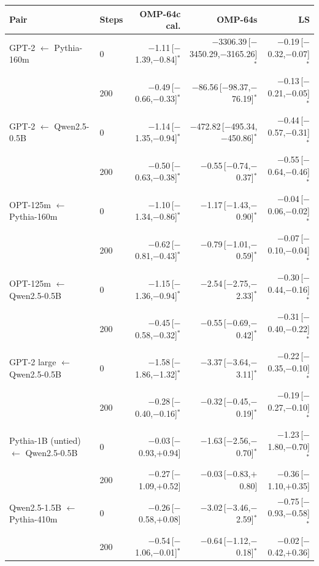 \begin{tabular}{llrrr}
\toprule
Pair & Steps & OMP-64c cal. & OMP-64s & LS \\
\midrule
GPT-2 $\leftarrow$ Pythia-160m & 0 & $-$1.11\,[$-$1.39,$-$0.84]$^{*}$ & $-$3306.39\,[$-$3450.29,$-$3165.26]$^{*}$ & $-$0.19\,[$-$0.32,$-$0.07]$^{*}$ \\
 & 200 & $-$0.49\,[$-$0.66,$-$0.33]$^{*}$ & $-$86.56\,[$-$98.37,$-$76.19]$^{*}$ & $-$0.13\,[$-$0.21,$-$0.05]$^{*}$ \\
\addlinespace
GPT-2 $\leftarrow$ Qwen2.5-0.5B & 0 & $-$1.14\,[$-$1.35,$-$0.94]$^{*}$ & $-$472.82\,[$-$495.34,$-$450.86]$^{*}$ & $-$0.44\,[$-$0.57,$-$0.31]$^{*}$ \\
 & 200 & $-$0.50\,[$-$0.63,$-$0.38]$^{*}$ & $-$0.55\,[$-$0.74,$-$0.37]$^{*}$ & $-$0.55\,[$-$0.64,$-$0.46]$^{*}$ \\
\addlinespace
OPT-125m $\leftarrow$ Pythia-160m & 0 & $-$1.10\,[$-$1.34,$-$0.86]$^{*}$ & $-$1.17\,[$-$1.43,$-$0.90]$^{*}$ & $-$0.04\,[$-$0.06,$-$0.02]$^{*}$ \\
 & 200 & $-$0.62\,[$-$0.81,$-$0.43]$^{*}$ & $-$0.79\,[$-$1.01,$-$0.59]$^{*}$ & $-$0.07\,[$-$0.10,$-$0.04]$^{*}$ \\
\addlinespace
OPT-125m $\leftarrow$ Qwen2.5-0.5B & 0 & $-$1.15\,[$-$1.36,$-$0.94]$^{*}$ & $-$2.54\,[$-$2.75,$-$2.33]$^{*}$ & $-$0.30\,[$-$0.44,$-$0.16]$^{*}$ \\
 & 200 & $-$0.45\,[$-$0.58,$-$0.32]$^{*}$ & $-$0.55\,[$-$0.69,$-$0.42]$^{*}$ & $-$0.31\,[$-$0.40,$-$0.22]$^{*}$ \\
\addlinespace
GPT-2 large $\leftarrow$ Qwen2.5-0.5B & 0 & $-$1.58\,[$-$1.86,$-$1.32]$^{*}$ & $-$3.37\,[$-$3.64,$-$3.11]$^{*}$ & $-$0.22\,[$-$0.35,$-$0.10]$^{*}$ \\
 & 200 & $-$0.28\,[$-$0.40,$-$0.16]$^{*}$ & $-$0.32\,[$-$0.45,$-$0.19]$^{*}$ & $-$0.19\,[$-$0.27,$-$0.10]$^{*}$ \\
\addlinespace
Pythia-1B (untied) $\leftarrow$ Qwen2.5-0.5B & 0 & $-$0.03\,[$-$0.93,$+$0.94] & $-$1.63\,[$-$2.56,$-$0.70]$^{*}$ & $-$1.23\,[$-$1.80,$-$0.70]$^{*}$ \\
 & 200 & $-$0.27\,[$-$1.09,$+$0.52] & $-$0.03\,[$-$0.83,$+$0.80] & $-$0.36\,[$-$1.10,$+$0.35] \\
\addlinespace
Qwen2.5-1.5B $\leftarrow$ Pythia-410m & 0 & $-$0.26\,[$-$0.58,$+$0.08] & $-$3.02\,[$-$3.46,$-$2.59]$^{*}$ & $-$0.75\,[$-$0.93,$-$0.58]$^{*}$ \\
 & 200 & $-$0.54\,[$-$1.06,$-$0.01]$^{*}$ & $-$0.64\,[$-$1.12,$-$0.18]$^{*}$ & $-$0.02\,[$-$0.42,$+$0.36] \\
\bottomrule
\end{tabular}

